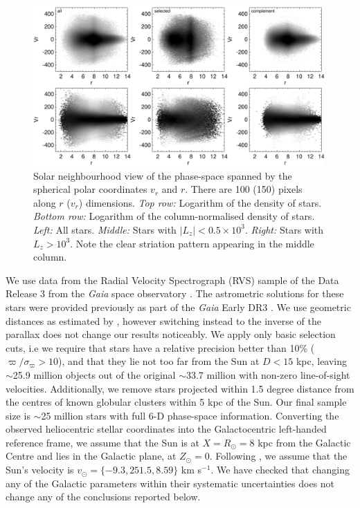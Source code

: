 \documentclass[a4paper,useAMS,usenatbib]{mnras}
\begin{document}
%
\begin{figure}
  \centering
  \includegraphics[width=0.99\textwidth]{img/phase_space_fig1.pdf}
  \caption[]{Solar neighbourhood view of the phase-space spanned by the spherical polar coordinates $v_r$ and $r$. There are 100 (150) pixels along $r$ ($v_r$) dimensions. {\it Top row:} Logarithm of the density of stars. {\it Bottom row:} Logarithm of the column-normalised density of stars. {\it Left:} All stars. {\it Middle:} Stars with $|L_z|<0.5\times10^3$. {\it Right:} Stars with $L_z>10^3$. Note the clear striation pattern appearing in the middle column.}
   \label{fig:phsp1}
\end{figure}
%

We use data from the Radial Velocity Spectrograph (RVS) sample \citep[][]{gdr3_rvs} of the Data Release 3 from the {\it Gaia} space observatory \citep[][]{Gaia}. The astrometric solutions for these stars were provided previously \citep[][]{Lindegren2021} as part of the {\it Gaia} Early DR3 \citep[][]{gaia_edr3}. We use geometric distances as estimated by \citet{BJ2021}, however switching instead to the inverse of the parallax does not change our results noticeably. We apply only basic selection cuts, i.e we require that stars have a  relative precision better than 10\% ( $\varpi/\sigma_{\varpi}>10$), and that they lie not too far from the Sun at $D<15$ kpc, leaving $\sim$25.9 million objects out of the original $\sim$33.7 million with non-zero line-of-sight velocities. Additionally, we remove stars projected within 1.5 degree distance from the centres of known globular clusters within 5 kpc of the Sun. Our final sample size is $\sim$25 million stars with full 6-D phase-space information. Converting the observed heliocentric stellar coordinates into the Galactocentric left-handed reference frame, we assume that the Sun is at $X=R_{\odot}=8$ kpc from the Galactic Centre \citep[although a slightly larger value was recently reported by][]{GRAVITY2022} and lies in the Galactic plane, at $Z_{\odot}=0$. Following \citet{Drimmel2022}, we assume that the Sun's velocity is $v_{\odot}=\{-9.3, 251.5, 8.59\}$ km s$^{-1}$. We have checked that changing any of the Galactic parameters within their systematic uncertainties does not change any of the conclusions reported below.
\end{document}
